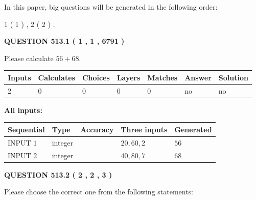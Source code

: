 \documentclass[12pt]{article}
\begin{document}
\vspace{0.2in}
   
In this paper, big questions will be generated in the following order: 
   
   
   1 ( 1 )
 ,
   2 ( 2 )
 .
  
\vspace{0.2in}
  
{\textbf{\Large{QUESTION
513.1 
 ( 1 , 1 , 6791 )
}}}
  
  
 
Please calculate $ %
56 +  %
68 $.
 
 
   
   
   
   
\noindent\begin{tabular}{|l|l|l|l|l|l|l|}
 \hline
Inputs & Calculates & Choices & Layers & Matches & Answer & Solution \\ \hline
 2  & 
 0  & 
 0
  & 
 0  & 
 0  & 
  no & 
  no 
  \\ \hline
 \end{tabular}
   
   
   
   
\noindent{}
   
   
   
   
\noindent\vspace{0.1in}\hspace{-0.08in} {\textbf{\Large{All inputs: }}}
   
   
  
  
\noindent\begin{tabular}{|l|l|l|l|l|}
\hline
 Sequential & Type & Accuracy & Three inputs & Generated \\ 
\hline
 
 
  INPUT $  1 $ & integer &  & $
 20
 , 
 60
 , 
 2
 $ & $ 56 $ 
 \\  \hline  
 
 
  INPUT $  2 $ & integer &  & $
 40
 , 
 80
 , 
 7
 $ & $ 68 $ 
 \\  \hline  
 \end{tabular}
   
   
  
\vspace{0.2in}
  
{\textbf{\Large{QUESTION
513.2 
 ( 2 , 2 , 3 )
}}}
  
  
Please choose the correct one from the following statements:
 
\end{document}
